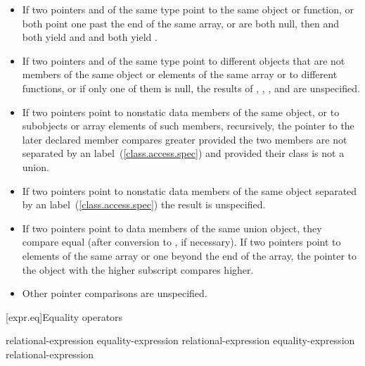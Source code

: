 \begin{itemize}
\item If two pointers  and  of the same type point to
the same object or function, or both point one past the end of the same
array, or are both null, then  and  both yield
 and  and  both yield .

\item If two pointers  and  of the same type point to
different objects that are not members of the same object or elements of
the same array or to different functions, or if only one of them is
null, the results of , , , and
 are unspecified.

\item If two pointers point to nonstatic data members of the same
object, or to subobjects or array elements of such members, recursively,
the pointer to the later declared member compares greater provided the
two members are not separated by an 
label~(\ref{class.access.spec}) and provided their class is not a union.

%
\item If two pointers point to nonstatic data members of the same
object separated by an 
label~(\ref{class.access.spec}) the result is unspecified.

\item If two pointers point to data members of the same union object,
they compare equal (after conversion to , if necessary). If
two pointers point to elements of the same array or one beyond the end
of the array, the pointer to the object with the higher subscript
compares higher.

%
%
\item Other pointer comparisons are unspecified.
\end{itemize}


[expr.eq]{Equality operators}%
%
%

\begin{bnf}
\br
    relational-expression\br
    equality-expression \terminal{==} relational-expression\br
    equality-expression \terminal{!=} relational-expression
\end{bnf}

